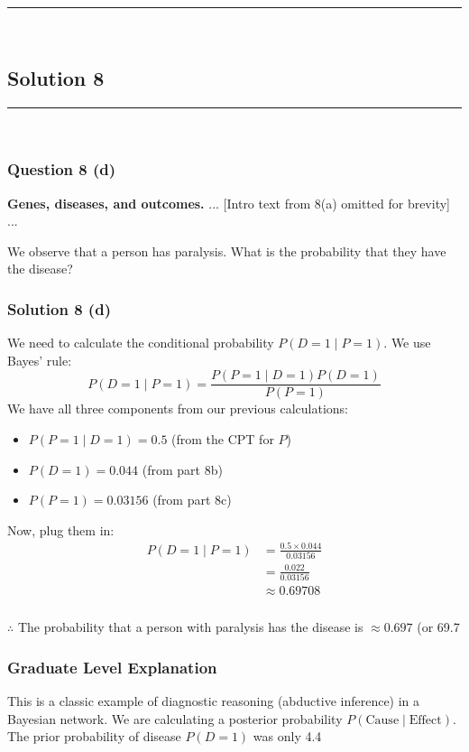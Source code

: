 \documentclass{article}
\begin{document}
{\noindent\rule{\textwidth}{0.4pt}\\

\newpage

\subsection*{Solution 8}
\noindent\rule{\textwidth}{0.4pt}\\
\subsubsection*{Question 8 (d)}
\begin{flushleft}
    \textbf{Genes, diseases, and outcomes.} ... [Intro text from 8(a) omitted for brevity] ...

    We observe that a person has paralysis. What is the probability that they have the disease? 
\end{flushleft}

\subsubsection*{Solution 8 (d)}
We need to calculate the conditional probability $P(D=1 \mid P=1)$. We use Bayes' rule:
$$ P(D=1 \mid P=1) = \frac{P(P=1 \mid D=1) P(D=1)}{P(P=1)} $$
We have all three components from our previous calculations:
\begin{itemize}
    \item $P(P=1 \mid D=1) = 0.5$ (from the CPT for $P$)
    \item $P(D=1) = 0.044$ (from part 8b)
    \item $P(P=1) = 0.03156$ (from part 8c)
\end{itemize}
Now, plug them in:
\begin{align*}
    P(D=1 \mid P=1) &= \frac{0.5 \times 0.044}{0.03156} \\
                   &= \frac{0.022}{0.03156} \\
                   &\approx 0.69708
\end{align*}

\subsubsection*{\normalfont}{$\therefore$ The probability that a person with paralysis has the disease is $\approx 0.697$ (or 69.7%

\subsubsection*{Graduate Level Explanation}
This is a classic example of diagnostic reasoning (abductive inference) in a Bayesian network. We are calculating a posterior probability $P(\text{Cause} \mid \text{Effect})$. The prior probability of disease $P(D=1)$ was only 4.4%

}}
\end{document}
